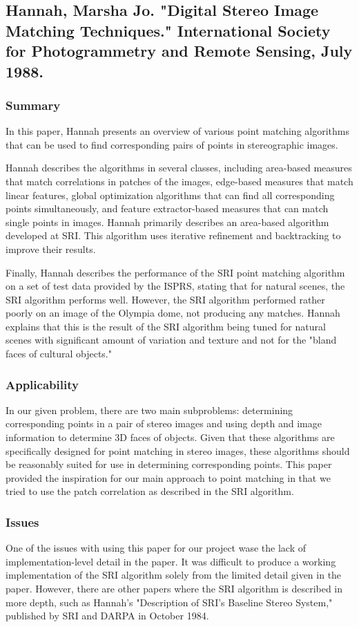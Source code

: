 \subsection{Hannah, Marsha Jo. "Digital Stereo Image Matching Techniques." International Society for Photogrammetry and Remote Sensing, July 1988.}

\subsubsection{Summary}
In this paper, Hannah presents an overview of various point matching algorithms that can be used to find corresponding pairs of points in stereographic images. 

Hannah describes the algorithms in several classes, including area-based measures that match correlations in patches of the images, edge-based measures that match linear features, global optimization algorithms that can find all corresponding points simultaneously, and feature extractor-based measures that can match single points in images. Hannah primarily describes an area-based algorithm developed at SRI. This algorithm uses iterative refinement and backtracking to improve their results. 

Finally, Hannah describes the performance of the SRI point matching algorithm on a set of test data provided by the ISPRS, stating that for natural scenes, the SRI algorithm performs well. However, the SRI algorithm performed rather poorly on an image of the Olympia dome, not producing any matches. Hannah explains that this is the result of the SRI algorithm being tuned for natural scenes with significant amount of variation and texture and not for the "bland faces of cultural objects."

\subsubsection{Applicability}
In our given problem, there are two main subproblems: determining corresponding points in a pair of stereo images and using depth and image information to determine 3D faces of objects. Given that these algorithms are specifically designed for point matching in stereo images, these algorithms should be reasonably suited for use in determining corresponding points. This paper provided the inspiration for our main approach to point matching in that we tried to use the patch correlation as described in the SRI algorithm.

\subsubsection{Issues}
One of the issues with using this paper for our project wase the lack of implementation-level detail in the paper. It was difficult to produce a working implementation of the SRI algorithm solely from the limited detail given in the paper. However, there are other papers where the SRI algorithm is described in more depth, such as Hannah's "Description of SRI's Baseline Stereo System," published by SRI and DARPA in October 1984. 

